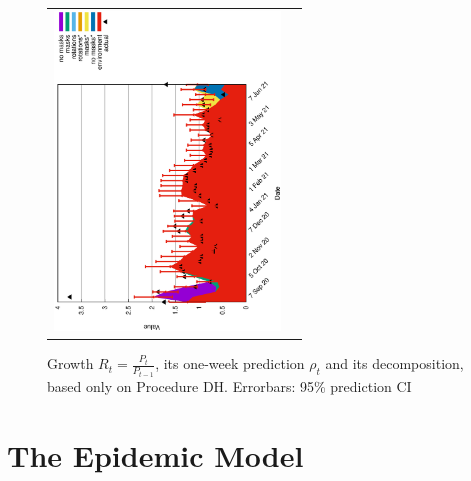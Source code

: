 \documentclass[fleqn,10pt]{wlscirep}
\begin{document}
\begin{figure}
\begin{center}
\begin{tabular}{cc}
\includegraphics[angle=270,width=6cm]{rho4h.eps}
\end{tabular}
\caption{Growth $R_t = \frac{P_{t}}{P_{t-1}}$, its one-week prediction $\rho_t$ and its decomposition, based only on Procedure DH. Errorbars: 95\% prediction CI}
\label{fig:rhodh}
\end{center}
\end{figure}

\section{The Epidemic Model}
\label{sec:epimodel}
\end{document}
